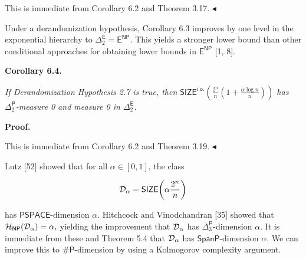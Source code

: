 This is immediate from Corollary 6.2 and Theorem 3.17.
$\blacktriangleleft$\par




Under a derandomization hypothesis, Corollary 6.3 improves by one level in the exponential hierarchy to $\Delta^{\mathsf{E}}_{2}=\mathsf{E}^{\mathsf{NP}}$. This yields a stronger lower bound than other conditional approaches for obtaining lower bounds in $\mathsf{E}^{\mathsf{NP}}$ [1, 8].\par





\par\medskip\noindent\textbf{
\textbf{Corollary 6.4}\textbf{.}
}\par



\emph{If Derandomization Hypothesis 2.7 is true, then
$\mathsf{SIZE}^{\mathsf{i.o.}}\!\!\left(\frac{2^{n}}{n}\left(1+\frac{\alpha\log
n}{n}\right)\right)$
has ${\Delta^{\mathsf{P}}_{2}}$-measure 0 and measure 0 in $\Delta^{\mathsf{E}}_{2}$.}\par







\par\medskip\noindent\textbf{Proof.}\par




This is immediate from Corollary 6.2 and Theorem 3.19.
$\blacktriangleleft$\par




Lutz [52] showed that
for all $\alpha\in[0,1]$, the class\par


\[\begin{gathered}
{\cal D}_{\alpha}=\mathsf{SIZE}\!\left(\alpha\frac{2^{n}}{n}\right)
\end{gathered}\]


has $\mathsf{PSPACE}$-dimension $\alpha$. Hitchcock and Vinodchandran [35] showed that
${\cal H}_{\mathsf{NP}}({\cal D}_{\alpha})=\alpha,$
yielding the improvement that ${\cal D}_{\alpha}$ has ${\Delta^{\mathsf{P}}_{3}}$-dimension $\alpha$.
It is immediate from these and Theorem 5.4 that ${\cal D}_{\alpha}$ has $\mathsf{SpanP}$-dimension $\alpha$.
We can improve this to ${\mathsf{\#}\mathsf{P}}$-dimension by using a Kolmogorov complexity argument.\par



